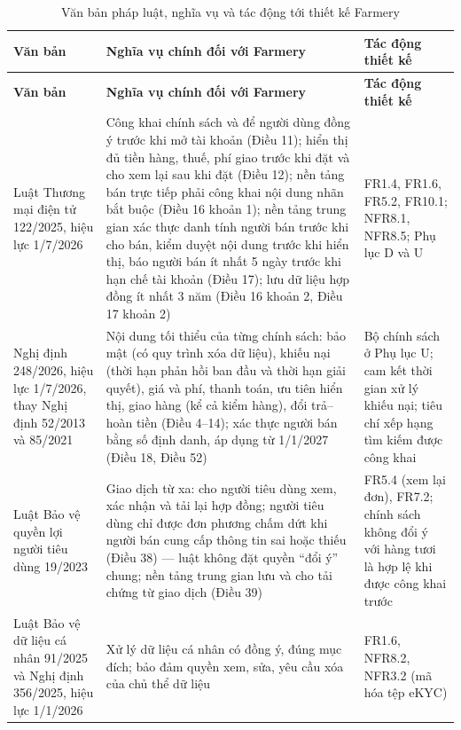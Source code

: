 \begingroup
\tblsetup\tblzebra
\begin{longtable}{L{3.50cm} L{6.70cm} L{4.70cm}}
\caption{Văn bản pháp luật, nghĩa vụ và tác động tới thiết kế Farmery}
\label{tab:phaply} \\
\toprule
{}
\textbf{Văn bản} & \textbf{Nghĩa vụ chính đối với Farmery} & \textbf{Tác động thiết kế} \\
\midrule
\endfirsthead
\toprule
{}
\textbf{Văn bản} & \textbf{Nghĩa vụ chính đối với Farmery} & \textbf{Tác động thiết kế} \\
\midrule
\endhead
\bottomrule
\endfoot
Luật Thương mại điện tử 122/2025, hiệu lực 1/7/2026 \parencite{luattmdt2025} & Công khai chính sách và để người dùng đồng ý trước khi mở tài khoản (Điều 11); hiển thị đủ tiền hàng, thuế, phí giao trước khi đặt và cho xem lại sau khi đặt (Điều 12); nền tảng bán trực tiếp phải công khai nội dung nhãn bắt buộc (Điều 16 khoản 1); nền tảng trung gian xác thực danh tính người bán trước khi cho bán, kiểm duyệt nội dung trước khi hiển thị, báo người bán ít nhất 5 ngày trước khi hạn chế tài khoản (Điều 17); lưu dữ liệu hợp đồng ít nhất 3 năm (Điều 16 khoản 2, Điều 17 khoản 2) & FR1.4, FR1.6, FR5.2, FR10.1; NFR8.1, NFR8.5; Phụ lục D và U \\
Nghị định 248/2026, hiệu lực 1/7/2026, thay Nghị định 52/2013 và 85/2021 \parencite{nd248_2026} & Nội dung tối thiểu của từng chính sách: bảo mật (có quy trình xóa dữ liệu), khiếu nại (thời hạn phản hồi ban đầu và thời hạn giải quyết), giá và phí, thanh toán, ưu tiên hiển thị, giao hàng (kể cả kiểm hàng), đổi trả--hoàn tiền (Điều 4--14); xác thực người bán bằng số định danh, áp dụng từ 1/1/2027 (Điều 18, Điều 52) & Bộ chính sách ở Phụ lục U; cam kết thời gian xử lý khiếu nại; tiêu chí xếp hạng tìm kiếm được công khai \\
Luật Bảo vệ quyền lợi người tiêu dùng 19/2023 \parencite{luatbvqlntd2023} & Giao dịch từ xa: cho người tiêu dùng xem, xác nhận và tải lại hợp đồng; người tiêu dùng chỉ được đơn phương chấm dứt khi người bán cung cấp thông tin sai hoặc thiếu (Điều 38) --- luật không đặt quyền ``đổi ý'' chung; nền tảng trung gian lưu và cho tải chứng từ giao dịch (Điều 39) & FR5.4 (xem lại đơn), FR7.2; chính sách không đổi ý với hàng tươi là hợp lệ khi được công khai trước \\
Luật Bảo vệ dữ liệu cá nhân 91/2025 và Nghị định 356/2025, hiệu lực 1/1/2026 \parencite{luatbvdlcn2025, nd356_2025} & Xử lý dữ liệu cá nhân có đồng ý, đúng mục đích; bảo đảm quyền xem, sửa, yêu cầu xóa của chủ thể dữ liệu & FR1.6, NFR8.2, NFR3.2 (mã hóa tệp eKYC) \\

\end{longtable}
